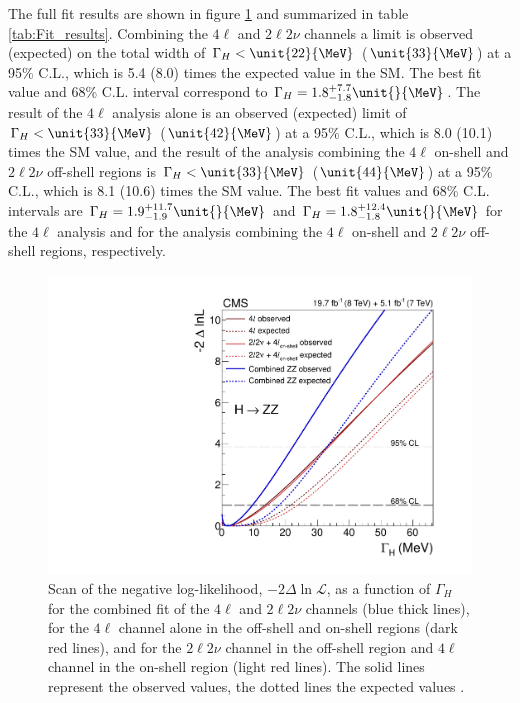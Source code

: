 The full fit results are shown in figure \ref{fig:finalplot} and summarized in table \ref{tab:Fit_results}.
Combining the $4\ell$ and $2\ell2\nu$ channels a limit is observed (expected) on the total width of $\Gamma_{H} < \unit{22}{\MeV}$
($\unit{33}{\MeV}$) at a 95\% C.L., which is 5.4 (8.0) times the expected value in the SM.
The best fit value and 68\% C.L. interval correspond to $\Gamma_{H} = 1.8^{+7.7}_{-1.8}\unit{}{\MeV}$. The
result of the $4\ell$ analysis alone is an observed (expected) limit of $\Gamma_{H} < \unit{33}{\MeV}$
($\unit{42}{\MeV}$) at a 95\% C.L., which is 8.0 (10.1) times the SM value, and the result of the
analysis combining the $4\ell$ on-shell and $2\ell 2\nu$ off-shell regions is $\Gamma_{H} < \unit{33}{\MeV}$
($\unit{44}{\MeV}$) at a 95\% C.L., which is 8.1 (10.6) times the SM value.
The best fit values and 68\% C.L. intervals are $\Gamma_{H} = 1.9^{+11.7}_{-1.9}\unit{}{\MeV}$ and
$\Gamma_{H} = 1.8^{+12.4}_{-1.8}\unit{}{\MeV}$ for the $4\ell$ analysis and for the analysis combining the $4\ell$
on-shell and $2\ell 2\nu$ off-shell regions, respectively.
\begin{figure}
\centering
\includegraphics[width=0.75\linewidth]{HZZ_Width/fig5_new.pdf}
\caption[Scan of the negative log-likelihood, $-2 \Delta \ln\mathcal{L}$, as a
function of $\Gamma_{H}$ for the combined fit of the $4\ell$ and
$2\ell 2\nu$ channels (blue thick lines), for the $4\ell$ channel alone in the
off-shell and on-shell regions (dark red lines), and for the $2\ell 2\nu$
channel in the off-shell region and $4\ell$ channel in the on-shell region
(light red lines). The solid lines represent the observed values, the dotted lines
the expected values]{
Scan of the negative log-likelihood, $-2 \Delta \ln\mathcal{L}$, as a
function of $\Gamma_{H}$ for the combined fit of the $4\ell$ and
$2\ell 2\nu$ channels (blue thick lines), for the $4\ell$ channel alone in the
off-shell and on-shell regions (dark red lines), and for the $2\ell 2\nu$
channel in the off-shell region and $4\ell$ channel in the on-shell region
(light red lines). The solid lines represent the observed values, the dotted lines
the expected values \cite{Khachatryan:2014iha}.
}
\label{fig:finalplot}
\end{figure}


